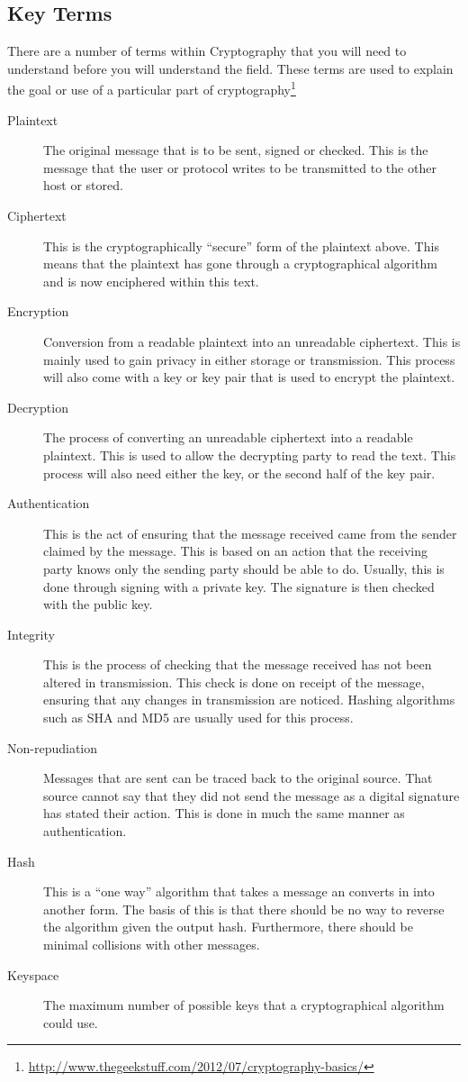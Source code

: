 \documentclass[a4paper,11pt]{report}
\begin{document}
		\subsection{Key Terms}
			There are a number of terms within Cryptography that you will need to understand before you will understand the field.
			These terms are used to explain the goal or use of a particular part of cryptography\footnote{\url{http://www.thegeekstuff.com/2012/07/cryptography-basics/}}
			\begin{description}
				\item[Plaintext]
					The original message that is to be sent, signed or checked. 
					This is the message that the user or protocol writes to be transmitted to the other host or stored. 
				\item[Ciphertext]
					This is the cryptographically ``secure'' form of the plaintext above. 
					This means that the plaintext has gone through a cryptographical algorithm and is now enciphered within this text. 
				\item[Encryption]
					Conversion from a readable plaintext into an unreadable ciphertext. 
					This is mainly used to gain privacy in either storage or transmission. 
					This process will also come with a key or key pair that is used to encrypt the plaintext. 
				\item[Decryption]
					The process of converting an unreadable ciphertext into a readable plaintext. 
					This is used to allow the decrypting party to read the text. 
					This process will also need either the key, or the second half of the key pair. 
				\item[Authentication]
					This is the act of ensuring that the message received came from the sender claimed by the message. 
					This is based on an action that the receiving party knows only the sending party should be able to do. 
					Usually, this is done through signing with a private key. 
					The signature is then checked with the public key. 
				\item[Integrity] 
					This is the process of checking that the message received has not been altered in transmission. 
					This check is done on receipt of the message, ensuring that any changes in transmission are noticed. 
					Hashing algorithms such as SHA and MD5 are usually used for this process. 
				\item[Non-repudiation]
					Messages that are sent can be traced back to the original source. 
					That source cannot say that they did not send the message as a digital signature has stated their action. 
					This is done in much the same manner as authentication. 
				\item[Hash]
					This is a ``one way'' algorithm that takes a message an converts in into another form. 
					The basis of this is that there should be no way to reverse the algorithm given the output hash. 
					Furthermore, there should be minimal collisions with other messages. 
				\item[Keyspace] The maximum number of possible keys that a cryptographical algorithm could use. 
			\end{description}
\end{document}
